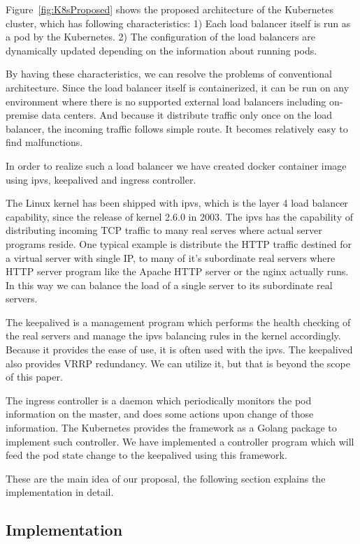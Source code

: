 Figure~\ref{fig:K8sProposed} shows the proposed architecture of the Kubernetes cluster, 
which has following characteristics:
1) Each load balancer itself is run as a pod by the Kubernetes. 
2) The configuration of the load balancers are dynamically updated depending on the information about running pods.

By having these characteristics, we can resolve the problems of conventional architecture.
Since the load balancer itself is containerized, it can be run on any environment 
where there is no supported external load balancers including on-premise data centers.
And because it distribute traffic only once on the load balancer, the incoming traffic follows simple route. 
It becomes relatively easy to find malfunctions.

In order to realize such a load balancer we have created docker container image using ipvs, keepalived and 
ingress controller.

The Linux kernel has been shipped with ipvs, which is the layer 4 load balancer capability,
since the release of kernel 2.6.0 in 2003. 
The ipvs has the capability of distributing incoming TCP traffic to many real serves where actual server programs reside.
One typical example is distribute the HTTP traffic destined for a virtual server with single IP, 
to many of it's subordinate real servers where HTTP server program like the Apache HTTP server or the nginx actually runs.
In this way we can balance the load of a single server to its subordinate real servers.

The keepalived is a management program which performs the health checking of the real servers 
and manage the ipvs balancing rules in the kernel accordingly.
Because it provides the ease of use, it is often used with the ipvs.
The keepalived also provides VRRP\cite{hinden2004virtual} redundancy.
We can utilize it, but that is beyond the scope of this paper.

The ingress controller is a daemon which periodically monitors the pod information on the master, 
and does some actions upon change of those information.
The Kubernetes provides the framework as a Golang package to implement such controller. 
We have implemented a controller program which will feed the pod state change to the keepalived 
using this framework. 

These are the main idea of our proposal, the following section explains the implementation in detail.

\subsection{Implementation}\label{Implementation}

